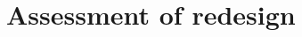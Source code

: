 \documentclass[a4paper]{scrartcl}
\begin{document}

\section{Assessment of redesign}

\end{document}
